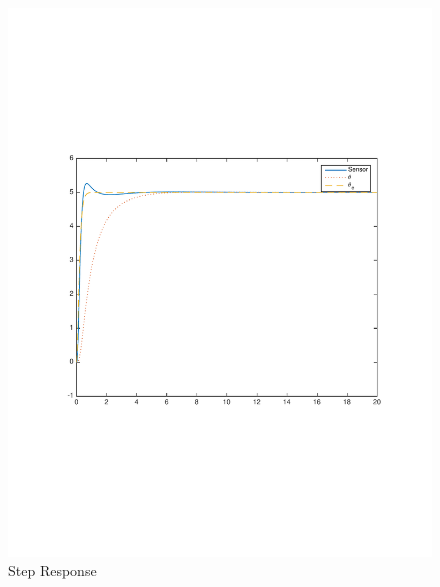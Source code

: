 \documentclass[12pt]{article}
\begin{document}
\begin{figure}[h]
\begin{center}
\includegraphics[width=1\textwidth]{figures/sensor}
\caption{Step Response}
\end{center}
\end{figure}
\end{document}
